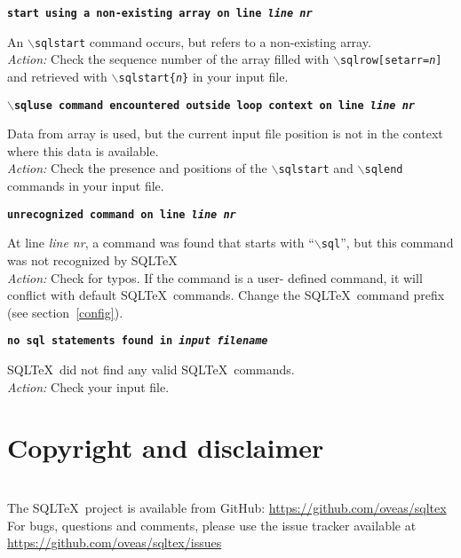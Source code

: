 \documentclass{article}
\newcommand{\bs}{\ensuremath{\backslash}}
\newcommand{\vs}{\vspace{3mm}}
\begin{document}
\vs

\noindent\textbf{\texttt{start using a non-existing array on line \textit{line nr}}}

\vspace{1mm}

\noindent An \texttt{\bs sqlstart} command occurs, but refers to a non-existing array. \\
\textit{Action:} Check the sequence number of the array filled with \texttt{\bs sqlrow[setarr=\textit{n}]} and retrieved with \texttt{\bs sqlstart\{\textit{n}\}} in your input file.

\vs

\noindent\textbf{\texttt{\bs sqluse command encountered outside loop context on line \textit{line nr}}}

\vspace{1mm}

\noindent Data from array is used, but the current input file position is not in the context where this data is available.\\
\textit{Action:} Check the presence and positions of the \texttt{\bs sqlstart} and \texttt{\bs sqlend} commands in your input file.

\vs

\noindent\textbf{\texttt{unrecognized command on line \textit{line nr}}}

\vspace{1mm}

\noindent At line \textit{line nr}, a command was found that starts with ``\texttt{\bs sql}'',
but this command was not recognized by SQL\TeX\. \\
\textit{Action:} Check for typos. If the command is a user- defined command, it will
conflict with default SQL\TeX\ commands. Change the SQL\TeX\ command prefix (see section~\ref{config}).

\vs

\noindent\textbf{\texttt{no sql statements found in \textit{input filename}}}

\vspace{1mm}

\noindent SQL\TeX\ did not find any valid SQL\TeX\ commands. \\
\textit{Action:} Check your input file.


\section{Copyright and disclaimer}

\noindent\hrulefill \\
The SQL\TeX\ project is available from GitHub: \url{https://github.com/oveas/sqltex}\\
For bugs, questions and comments, please use the issue tracker available at \url{https://github.com/oveas/sqltex/issues}
\end{document}
